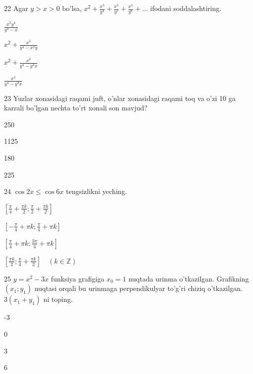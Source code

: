 \documentclass[14pt]{article}
\begin{document}
\begin{questionbox}{22}
    Agar \(y > x > 0\) bo'lsa, \(x^2 + \frac{x^3}{y^4} + \frac{x^5}{y^5} + \frac{x^5}{y^6} + \dots\) ifodani soddalashtiring.
    \begin{options}
        \item \(\frac{x^2y^4}{y^4-x}\)
        \item \(x^2 + \frac{x^3}{y^4-x^3y}\)
        \item \(x^2 + \frac{x^3}{y^4-y^3x}\)
        \item \(\frac{x^3}{y^4-y^3x}\)
    \end{options}
\end{questionbox}

\begin{questionbox}{23}
    Yuzlar xonasidagi raqami juft, o'nlar xonasidagi raqami toq va o'zi 10 ga karrali bo'lgan nechta to'rt xonali son mavjud?
    \begin{options}
        \item 250
        \item 1125
        \item 180
        \item 225
    \end{options}
\end{questionbox}

\begin{questionbox}{24}
    \(\cos 2x \leq \cos 6x\) tengsizlikni yeching.
    \begin{options}
        \item \(\left[\frac{\pi}{4} + \frac{\pi k}{2}; \frac{\pi}{2} + \frac{\pi k}{2}\right]\)
        \item \(\left[-\frac{\pi}{4} + \pi k; \frac{\pi}{4} + \pi k\right]\)
        \item \(\left[\frac{\pi}{4} + \pi k; \frac{3\pi}{4} + \pi k\right]\)
        \item \(\left[\frac{\pi k}{2}; \frac{\pi}{4} + \frac{\pi k}{2}\right] \quad (k \in \mathbb{Z})\)
    \end{options}
\end{questionbox}

\begin{questionbox}{25}
    \(y = x^2 - 3x\) funksiya grafigiga \(x_0 = 1\) nuqtada urinma o'tkazilgan. Grafikning \((x_1; y_1)\) nuqtasi orqali bu urinmaga perpendikulyar to'g'ri chiziq o'tkazilgan. \(3(x_1+y_1)\) ni toping.
    \begin{options}
        \item -3
        \item 0
        \item 3
        \item 6
    \end{options}
\end{questionbox}
\end{document}

